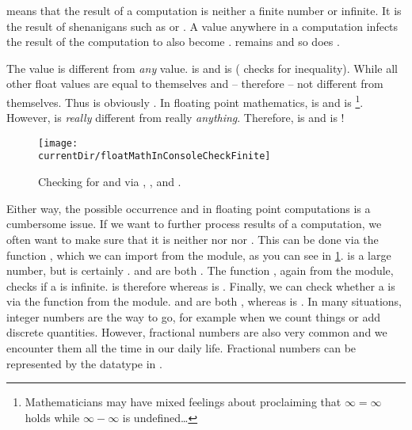  means that the result of a computation is neither a finite number or infinite.
It is the result of shenanigans such as  or .
A  value anywhere in a computation infects the result of the computation to also become .
 remains  and so does .

The value  is different from \emph{any} value.
 is  and  is  (\pythonilIdx{!=} checks for inequality).
While all other float values are equal to themselves and -- therefore -- not different from themselves.
Thus  is obviously .
In floating point mathematics,  is  and  is \footnote{%
Mathematicians may have mixed feelings about proclaiming that $\infty=\infty$ holds while $\infty-\infty$ is undefined\dots}.
However,  is \emph{really} different from really \emph{anything}.
Therefore, \pythonIdx{==} is  and \pythonIdx{!=} is !

\begin{figure}%
\centering%
\texttt{[image: \\currentDir/floatMathInConsoleCheckFinite]}%
\caption{Checking for  and  via , , and .}%
\label{fig:floatMathInConsoleCheckFinite}%
\end{figure}%

Either way, the possible occurrence  and  in floating point computations is a cumbersome issue.
If we want to further process results of a computation, we often want to make sure that it is neither  nor  nor .
This can be done via the function , which we can import from the  module, as you can see in \cref{fig:floatMathInConsoleCheckFinite}.
 is a large number, but  is certainly .
 and  are both .
The function , again from the  module, checks if a  is infinite.
 is therefore  whereas  is .
Finally, we can check whether a  is  via the  function from the  module.
 and  are both , whereas  is .%
%
\endhsection%
%
%
%
In many situations, integer numbers are the way to go, for example when we count things or add discrete quantities.
However, fractional numbers are also very common and we encounter them all the time in our daily life.
Fractional numbers can be represented by the  datatype in \python.

